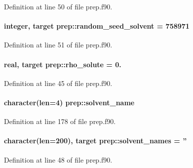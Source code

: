 Definition at line 50 of file prep.\-f90.

\hypertarget{classprep_a1a7de818be67e3e32a510b0bad624a5b}{
\paragraph[{random\-\_\-seed\-\_\-solvent}]{\setlength{\rightskip}{0pt plus 5cm}integer, target prep\-::random\-\_\-seed\-\_\-solvent = 758971}}\label{classprep_a1a7de818be67e3e32a510b0bad624a5b}


Definition at line 51 of file prep.\-f90.

\hypertarget{classprep_ade49a05a54bea9b47761d04a3087afa5}{
\paragraph[{rho\-\_\-solute}]{\setlength{\rightskip}{0pt plus 5cm}real, target prep\-::rho\-\_\-solute = 0.}}\label{classprep_ade49a05a54bea9b47761d04a3087afa5}


Definition at line 45 of file prep.\-f90.

\hypertarget{classprep_aa665c6e3401ced3ba9d6e361beb2a4b5}{
\paragraph[{solvent\-\_\-name}]{\setlength{\rightskip}{0pt plus 5cm}character(len=4) prep\-::solvent\-\_\-name}}\label{classprep_aa665c6e3401ced3ba9d6e361beb2a4b5}


Definition at line 178 of file prep.\-f90.

\hypertarget{classprep_a23cb9b5f1c2ed42421091cd8a8566d02}{
\paragraph[{solvent\-\_\-names}]{\setlength{\rightskip}{0pt plus 5cm}character(len=200), target prep\-::solvent\-\_\-names = ''}}\label{classprep_a23cb9b5f1c2ed42421091cd8a8566d02}


Definition at line 48 of file prep.\-f90.

